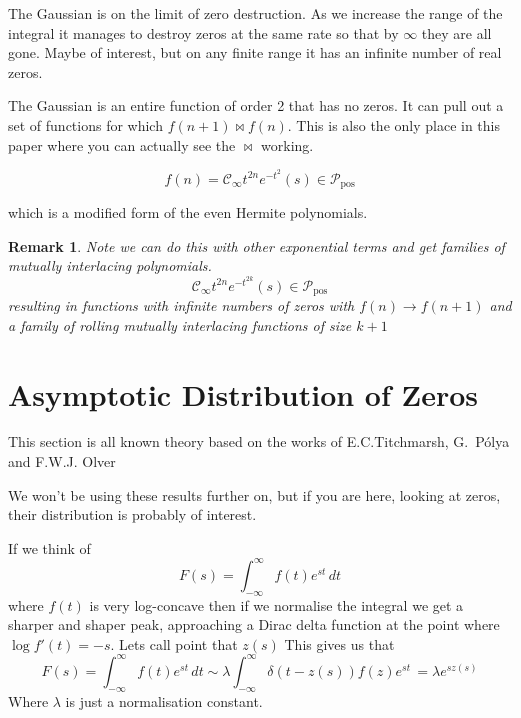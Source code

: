 \documentclass[11pt]{article}
\theoremstyle{breakdef}
\newtheorem{remark}[theorem]{Remark}
\begin{document}
The Gaussian is on the limit of zero destruction.  As we increase the range of the integral it manages to destroy zeros at the same rate so that by $\infty$  they are all gone.  Maybe of interest, but on any finite range it has an infinite number of real zeros.

The Gaussian is an entire function of order 2 that has no zeros. It can pull out a set of functions for which $ f(n+1) \bowtie f(n)$.  This is also the only place in this paper where you can actually see the $\bowtie$ working.

\begin{equation}
f(n) = \mathcal{C}_{\infty} t^{2n} e^{-t^2} (s) \in \mathcal{P}_{\mathrm{pos}}
\end{equation}

which is a modified form of the even Hermite polynomials.


\begin{remark}
Note we can do this with other exponential terms and get families of mutually interlacing polynomials.
\begin{equation}
\mathcal{C}_{\infty} t^{2n} e^{-t^{2k}} (s) \in \mathcal{P}_{\mathrm{pos}}
\end{equation}
resulting in functions with infinite numbers of zeros with $f(n) \to f(n+1)$ and a family of rolling mutually interlacing functions of size $k+1$
\end{remark}

\section{Asymptotic Distribution of Zeros}
This section is all known theory based on the works of E.C.Titchmarsh,
G.~P\'olya and 
F.W.J. Olver \newline
\newline

We won't be using these results further on, but if you are here, looking at zeros, their distribution is probably of interest. \newline


If we think of 
\begin{equation}
F(s) = \int_{-\infty }^{\infty } f(t) e^{s t} \, dt
\end{equation}
where $f(t)$ is very log-concave then if we normalise the integral we get a sharper and shaper peak, approaching a Dirac delta function at the point where $\log{f'(t)}=-s$. Lets call point that $z(s)$
 This gives us that 
\begin{equation}
F(s) = \int_{-\infty }^{\infty } 
f(t) e^{s t} \, dt \sim  
\lambda \int_{-\infty }^{\infty } 
\delta(t-z(s))f(z) e^{s t} \, = \lambda e^{s z(s)}
\end{equation}
Where $\lambda$ is just a normalisation constant.
\end{document}
